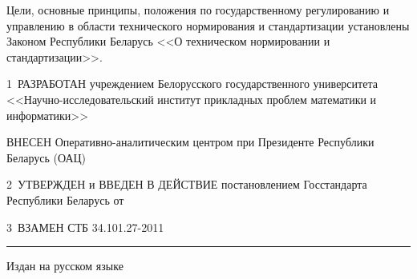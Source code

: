 Цели, основные принципы, положения по государственному регулированию и 
управлению в области технического нормирования и стандартизации 
установлены Законом Республики Беларусь <<О техническом нормировании и 
стандартизации>>.  

\vskip0.2cm

1~РАЗРАБОТАН учреждением Белорусского государственного университета
<<Науч\-но-исследовательский институт прикладных проблем математики и информатики>>

ВНЕСЕН Оперативно-аналитическим центром при Президенте Республики Беларусь (ОАЦ)

2~УТВЕРЖДЕН и ВВЕДЕН В ДЕЙСТВИЕ постановлением Госстандарта Республики 
Беларусь от $\phantom{\text{25 ноября 2011 г.}}$ \No~$\phantom{\text{83}}$ 

3~ВЗАМЕН СТБ 34.101.27-2011

\vfill

\hrule
\vskip1mm
Издан на русском языке

\pagebreak
